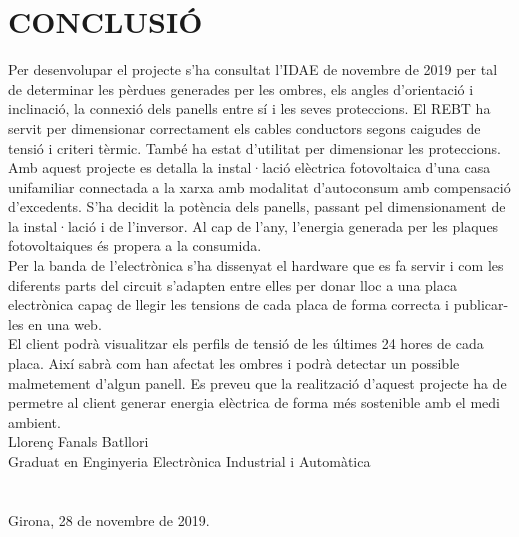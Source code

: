 \chapter{\uppercase{Conclusió}}
Per desenvolupar el projecte s'ha consultat l'IDAE de novembre de 2019 per tal de determinar les pèrdues generades per les ombres, els angles d'orientació i inclinació, la connexió dels panells entre sí i les seves proteccions. El REBT ha servit per dimensionar correctament els cables conductors segons caigudes de tensió i criteri tèrmic. També ha estat d'utilitat per dimensionar les proteccions.\\
\newline Amb aquest projecte es detalla la instal·lació elèctrica fotovoltaica d'una casa unifamiliar connectada a la xarxa amb modalitat d'autoconsum amb compensació d'excedents. S'ha decidit la potència dels panells, passant pel dimensionament de la instal·lació i de l'inversor. Al cap de l'any, l'energia generada per les plaques fotovoltaiques és propera a la consumida.\\
\newline Per la banda de l'electrònica s'ha dissenyat el hardware que es fa servir i com les diferents parts del circuit s'adapten entre elles per donar lloc a una placa electrònica capaç de llegir les tensions de cada placa de forma correcta i publicar-les en una web.\\
\newline El client podrà visualitzar els perfils de tensió de les últimes 24 hores de cada placa. Així sabrà com han afectat les ombres i podrà detectar un possible malmetement d'algun panell. Es preveu que la realització d'aquest projecte ha de permetre al client generar energia elèctrica de forma més sostenible amb el medi ambient. \\

\vspace*{\fill}
\noindent Llorenç Fanals Batllori\\
Graduat en Enginyeria Electrònica Industrial i Automàtica\\
\\
\\
Girona, 28 de novembre de 2019.

\clearpage